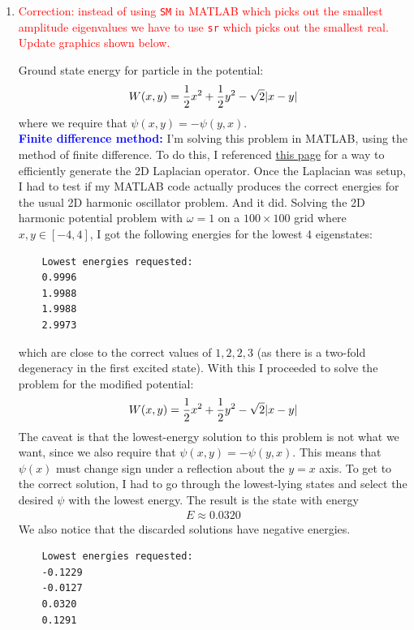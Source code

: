 \documentclass{article}
\theoremstyle{definition}
\newcommand{\f}[2]{\frac{#1}{#2}}
\begin{document}
\begin{enumerate}[label=(\alph*)]
	
	
	
	
	\item \textcolor{red}{Correction: instead of using \texttt{SM} in MATLAB which picks out the smallest amplitude eigenvalues we have to use \texttt{sr} which picks out the smallest real. Update graphics shown below.}
	
	
	Ground state energy for particle in the potential:
	\begin{align*}
	W(x,y) = \f{1}{2}x^2 + \f{1}{2}y^2 - \sqrt{2}\abs{x-y}
	\end{align*}
	where we require that $\psi(x,y) = -\psi(y,x)$. \\
	
	
	\textbf{\textcolor{blue}{Finite difference method:}} I'm solving this problem in MATLAB, using the method of finite difference. To do this, I referenced \href{https://www.mathworks.com/matlabcentral/fileexchange/69885-q_schrodinger2d_demo}{{this page}} for a way to efficiently generate the 2D Laplacian operator. Once the Laplacian was setup, I had to test if my MATLAB code actually produces the correct energies for the usual 2D harmonic oscillator problem. And it did. Solving the 2D harmonic potential problem with $\omega = 1$ on a $100\times 100$ grid where $x,y\in [-4,4]$, I got the following energies for the lowest 4 eigenstates:
	\begin{lstlisting}
	Lowest energies requested: 
	0.9996
	1.9988
	1.9988
	2.9973
	\end{lstlisting}
	which are close to the correct values of $1,2,2,3$ (as there is a two-fold degeneracy in the first excited state). With this I proceeded to solve the problem for the modified potential:
	\begin{align*}
	W(x,y) = \f{1}{2}x^2 + \f{1}{2}y^2 - \sqrt{2}\abs{x-y}
	\end{align*}
	The caveat is that the lowest-energy solution to this problem is not what we want, since we also require that $\psi(x,y) = -\psi(y,x)$. This means that $\psi(x)$ must change sign under a reflection about the $y=x$ axis. To get to the correct solution, I had to go through the lowest-lying states and select the desired $\psi$ with the lowest energy. The result is the state with energy 
	\begin{align*}
	\boxed{E \approx 0.0320}
	\end{align*}
	We also notice that the discarded solutions have negative energies. 
	\begin{lstlisting}
	Lowest energies requested: 
	-0.1229
	-0.0127
	0.0320
	0.1291
	\end{lstlisting}
	

\end{enumerate}
\end{document}
